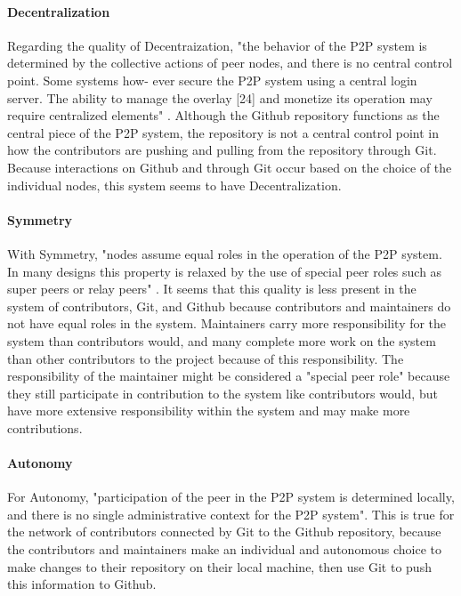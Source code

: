 \paragraph{Decentralization}

Regarding the quality of Decentraization, "the behavior of the P2P system is determined by the collective
actions of peer nodes, and there is no central control point. Some systems how-
ever secure the P2P system using a central login server. The ability to manage
the overlay [24] and monetize its operation may require centralized elements" \cite{peertopeerhandbook}. Although the Github repository functions as the central piece of the P2P system, the repository is not a central control point in how the contributors are pushing and pulling from the repository through Git. Because interactions on Github and through Git occur based on the choice of the individual nodes, this system seems to have Decentralization. 

\paragraph{Symmetry}

With Symmetry, "nodes assume equal roles in the operation of the P2P system. In many
designs this property is relaxed by the use of special peer roles such as super
peers or relay peers" \cite{peertopeerhandbook}. It seems that this quality is less present in the system of contributors, Git, and Github because contributors and maintainers do not have equal roles in the system. Maintainers carry more responsibility for the system than contributors would, and many complete more work on the system than other contributors to the project because of this responsibility. The responsibility of the maintainer might be considered a "special peer role" because they still participate in contribution to the system like contributors would, but have more extensive responsibility within the system and may make more contributions. 

\paragraph{Autonomy}

For Autonomy, "participation of the peer in the P2P system is determined locally, and
there is no single administrative context for the P2P system"\cite{peertopeerhandbook}. This is true for the network of contributors connected by Git to the Github repository, because the contributors and maintainers make an individual and autonomous choice to make changes to their repository on their local machine, then use Git to push this information to Github. 

